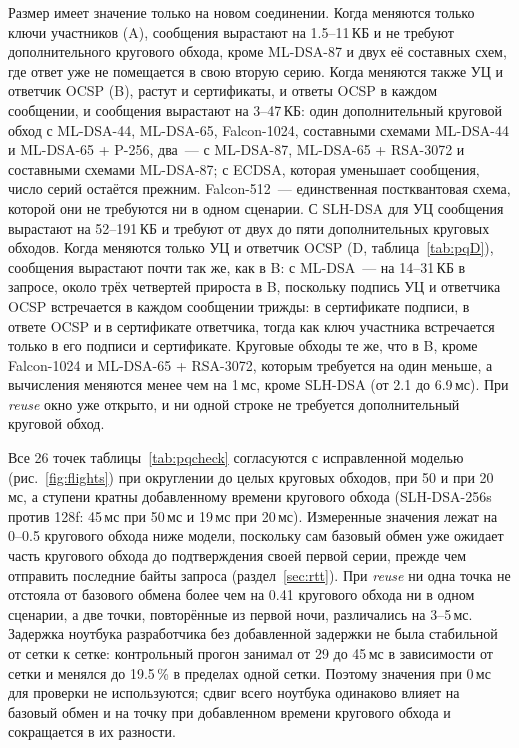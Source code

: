 \documentclass[conference,a4paper]{IEEEtran}
\newcommand{\newtext}[1]{{\color{blue}#1}}
\newcommand{\newgreen}[1]{{\color{green!50!black}#1}}
\newcommand{\newviolet}[1]{{\color{violet}#1}}
\begin{document}
{Размер имеет значение только на новом соединении. Когда меняются только ключи участников (A), сообщения вырастают на
1.5--11\,КБ и не требуют дополнительного кругового обхода, кроме ML-DSA-87 \newgreen{и двух её составных схем}, где ответ уже не
помещается в свою вторую серию. Когда меняются также УЦ и ответчик OCSP (B), растут и сертификаты,
и ответы OCSP в каждом сообщении, и сообщения вырастают на 3--47\,КБ: один дополнительный
круговой обход с ML-DSA-44, ML-DSA-65, Falcon-1024\newviolet{,} составными схемами ML-DSA-44 \newviolet{и
ML-DSA-65 + P-256}, два~--- с ML-DSA-87\newviolet{, ML-DSA-65 + RSA-3072} и составными схемами
ML-DSA-87\newviolet{; с ECDSA, которая уменьшает сообщения, число серий остаётся прежним}. Falcon-512~--- единственная постквантовая схема, которой они не требуются \newtext{ни в одном} сценарии. С SLH-DSA
для УЦ сообщения вырастают на 52--191\,КБ и требуют от двух до пяти дополнительных круговых обходов.
\newtext{Когда меняются только УЦ и ответчик OCSP (D, таблица~\ref{tab:pqD}), сообщения вырастают
почти так же, как в B: с ML-DSA~--- на 14--31\,КБ в запросе, около трёх четвертей
прироста в B, поскольку подпись УЦ и ответчика OCSP встречается в каждом сообщении трижды:
в сертификате подписи, в ответе OCSP и в сертификате ответчика,
тогда как ключ участника встречается только в его подписи и сертификате. Круговые обходы те же,
что в B, кроме Falcon-1024 и \newviolet{ML-DSA-65 + RSA-3072}, которым требуется на один меньше, а
вычисления меняются менее чем на 1\,мс, кроме SLH-DSA (от 2.1 до 6.9\,мс).} При
\emph{reuse} окно уже открыто, и ни одной строке не требуется дополнительный круговой обход.

\newtext{Все} \newviolet{26} \newtext{точек таблицы~\ref{tab:pqcheck} согласуются с исправленной моделью} \newviolet{(рис.~\ref{fig:flights})} при округлении
до целых круговых обходов, при 50 и при 20\,мс, а ступени кратны добавленному времени кругового обхода
(SLH-DSA-256s против 128f: 45\,мс при 50\,мс и 19\,мс при 20\,мс). Измеренные значения лежат на 0--0.5
кругового обхода ниже модели, поскольку сам базовый обмен уже ожидает часть кругового обхода
до подтверждения своей первой серии, прежде чем отправить последние байты запроса
(раздел~\ref{sec:rtt}). При \emph{reuse} \newgreen{ни одна точка не отстояла от базового обмена более чем на 0.41 кругового
обхода} ни в одном сценарии,
а две точки, повторённые из первой ночи, различались на 3--5\,мс. \newgreen{Задержка
ноутбука разработчика без добавленной задержки не была стабильной от сетки к сетке: контрольный прогон занимал
от 29 до 45\,мс в зависимости от сетки и менялся до 19.5\,\% в пределах одной сетки. Поэтому значения при 0\,мс
для проверки не используются; сдвиг всего ноутбука одинаково влияет на базовый обмен и на точку
при добавленном времени кругового обхода и сокращается в их разности.}

}
\end{document}

